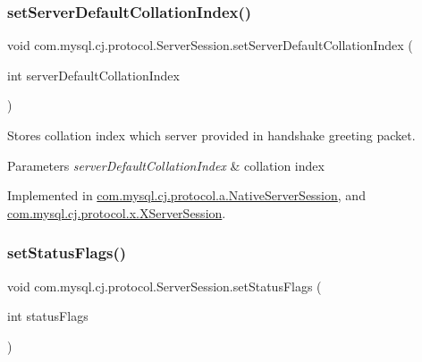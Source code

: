 \mbox{\label{interfacecom_1_1mysql_1_1cj_1_1protocol_1_1_server_session_aa712ac71a0771a45a3f8b46ceaac4178}} 
\subsubsection{\texorpdfstring{set\+Server\+Default\+Collation\+Index()}{setServerDefaultCollationIndex()}}
{\footnotesize\ttfamily void com.\+mysql.\+cj.\+protocol.\+Server\+Session.\+set\+Server\+Default\+Collation\+Index (\begin{DoxyParamCaption}\item[{int}]{server\+Default\+Collation\+Index }\end{DoxyParamCaption})}

Stores collation index which server provided in handshake greeting packet.


\begin{DoxyParams}{Parameters}
{\em server\+Default\+Collation\+Index} & collation index \\
\hline
\end{DoxyParams}


Implemented in \mbox{\hyperlink{classcom_1_1mysql_1_1cj_1_1protocol_1_1a_1_1_native_server_session_abd6266538f2562073361edbc958a3304}{com.\+mysql.\+cj.\+protocol.\+a.\+Native\+Server\+Session}}, and \mbox{\hyperlink{classcom_1_1mysql_1_1cj_1_1protocol_1_1x_1_1_x_server_session_a2356570d8139fdbd022d253859128cd4}{com.\+mysql.\+cj.\+protocol.\+x.\+X\+Server\+Session}}.

\mbox{\label{interfacecom_1_1mysql_1_1cj_1_1protocol_1_1_server_session_a855cbd715a8c33299d062a72fd75d8f4}} 
\subsubsection{\texorpdfstring{set\+Status\+Flags()}{setStatusFlags()}\hspace{0.1cm}{\footnotesize\ttfamily [1/2]}}
{\footnotesize\ttfamily void com.\+mysql.\+cj.\+protocol.\+Server\+Session.\+set\+Status\+Flags (\begin{DoxyParamCaption}\item[{int}]{status\+Flags }\end{DoxyParamCaption})}

